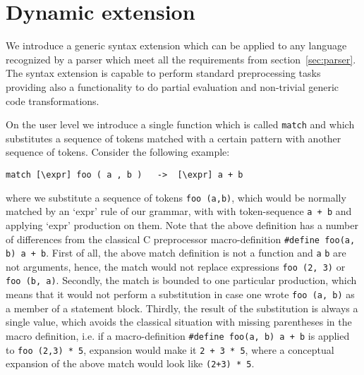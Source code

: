 \section{Dynamic extension}

We introduce a generic syntax extension which can be applied to any
language recognized by a parser which meet all the requirements from
section~\ref{sec:parser}.  The syntax extension is capable to perform
standard preprocessing tasks providing also a functionality to do
partial evaluation and non-trivial generic code transformations.

On the user level we introduce a single function which is called 
\verb|match| and which substitutes a sequence of tokens matched
with a certain pattern with another sequence of tokens.  
Consider the following example:
\begin{verbatim}
match [\expr] foo ( a , b )   ->  [\expr] a + b
\end{verbatim}
where we substitute a sequence of tokens \verb|foo (a,b)|, which would 
be normally matched by an `expr' rule of our grammar, with  with
token-sequence \verb|a + b| and applying `expr' production on them.
Note that the above definition has a number of differences from the 
classical C preprocessor macro-definition \verb|#define foo(a, b) a + b|.
First of all, the above match definition is not a function and \verb|a|
\verb|b| are not arguments, hence, the match would not replace
expressions \verb|foo (2, 3)| or \verb|foo (b, a)|.  Secondly, the
match is bounded to one particular production, which means that it
would not perform a substitution in case one wrote \verb|foo (a, b)|
as a member of a statement block.  Thirdly, the result of the
substitution is always a single value, which avoids the classical
situation with missing parentheses in the macro definition, i.e.
if a macro-definition \verb|#define foo(a, b) a + b| is applied to 
\verb|foo (2,3) * 5|, expansion would make it \verb|2 + 3 * 5|, where
a conceptual expansion of the above match would look like 
\verb|(2+3) * 5|.





